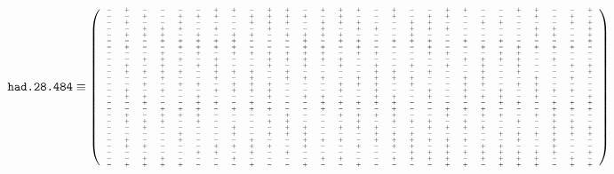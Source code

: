 \documentclass[11pt,a4paper]{article}
\begin{document}
\[\texttt{had.28.484}\equiv {\fontsize{4}{5}\selectfont \left( \begin{array}{cccccccccccccccccccccccccccc}
-&+&-&-&-&-&+&+&-&+&+&-&+&+&+&-&+&-&-&+&+&-&-&+&+&-&-&+\\
-&-&+&-&+&+&+&-&+&+&+&+&-&+&-&-&+&-&+&+&-&-&-&-&+&-&+&-\\
-&+&-&-&+&-&-&-&+&+&+&-&+&+&+&-&-&+&+&-&-&+&+&-&-&-&+&+\\
-&-&+&+&+&-&+&-&-&+&-&-&+&-&+&+&-&+&+&+&-&-&-&-&+&+&-&+\\
-&+&+&+&-&+&-&+&+&-&+&+&+&+&-&-&-&+&-&-&-&-&-&-&+&+&-&+\\
-&-&-&+&+&+&+&+&-&-&-&+&-&+&+&-&+&+&+&-&+&-&+&-&-&-&-&+\\
-&+&-&-&+&+&+&+&-&-&-&+&+&-&+&-&-&-&+&-&-&+&-&+&+&+&+&-\\
-&-&-&+&-&+&-&+&+&+&+&+&+&-&+&+&-&-&+&+&-&-&+&+&-&-&-&-\\
-&-&+&+&+&-&+&-&-&+&+&+&+&+&-&-&-&-&-&-&+&+&+&+&-&+&-&-\\
-&+&-&+&-&+&+&-&-&+&-&+&-&+&-&+&-&+&-&+&-&+&-&+&-&-&+&+\\
-&+&+&+&+&-&+&+&+&-&+&-&-&-&-&+&+&-&+&-&-&+&-&+&-&-&-&+\\
-&-&-&+&-&-&+&-&+&-&+&+&+&-&+&+&+&+&-&-&+&+&-&-&+&-&+&-\\
-&-&+&-&+&+&-&+&+&+&-&-&-&+&+&+&-&+&-&-&+&+&-&+&+&-&-&-\\
-&+&-&+&-&-&+&+&+&+&-&-&-&+&-&+&-&-&+&-&+&-&+&-&+&+&+&-\\
-&+&+&-&-&+&-&-&-&+&-&+&+&-&-&+&+&-&+&-&+&+&+&-&+&-&-&+\\
-&-&+&-&-&+&+&-&+&-&-&-&+&+&+&+&+&-&-&-&-&-&+&+&-&+&+&+\\
-&-&-&+&+&+&-&+&+&+&-&-&+&-&-&-&+&-&-&+&+&+&-&-&-&+&+&+\\
-&+&-&+&+&+&-&-&-&-&+&-&-&+&+&+&+&-&-&+&-&+&+&-&+&+&-&-\\
-&+&+&+&-&+&-&-&-&+&+&-&-&-&+&-&+&+&+&-&+&-&-&+&-&+&+&-\\
-&-&+&-&-&-&-&+&-&-&+&+&-&+&+&+&-&-&+&+&+&+&-&-&-&+&+&+\\
-&-&-&-&+&-&-&+&-&+&+&+&-&-&-&+&+&+&-&-&-&-&+&+&+&+&+&+\\
-&+&-&-&+&-&-&-&+&-&-&+&+&+&-&+&+&+&+&+&+&-&-&+&-&+&-&-\\
-&+&+&-&-&-&+&+&+&+&-&+&-&-&+&-&+&+&-&+&-&+&+&-&-&+&-&-\\
-&-&-&-&-&+&+&-&+&-&+&-&-&-&-&-&-&+&+&+&+&+&+&+&+&+&-&+\\
-&-&+&+&-&-&-&+&-&-&-&-&+&+&-&-&+&+&+&+&-&+&+&+&+&-&+&-\\
-&+&+&+&+&-&-&-&+&-&-&+&-&-&+&-&-&-&-&+&+&-&+&+&+&-&+&+
  \end{array}
  \right)}\]
\end{document}

